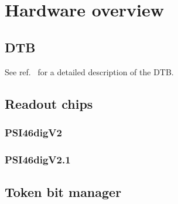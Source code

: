 \section{Hardware overview}
\label{s:hwOverview}


\subsection{DTB}
\label{ss:dtb}
See ref.~\cite{dtbmanual} for a detailed description of the DTB.


\subsection{Readout chips}
\label{ss:roc}

\subsubsection{PSI46digV2}
\label{sss:PSI46digV2}

\subsubsection{PSI46digV2.1}
\label{sss:PSI46digV21}


\subsection{Token bit manager}
\label{ss:tbm}
